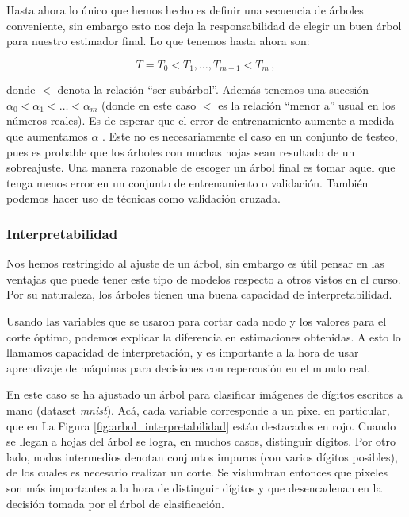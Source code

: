 Hasta ahora lo único que hemos hecho es definir una secuencia de árboles conveniente, sin embargo esto nos deja la responsabilidad de elegir un buen árbol para nuestro estimador final. Lo que tenemos hasta ahora son:

\begin{equation}
    T = T_0 < T_1, \dots, T_{m-1} < T_m \,,
\end{equation}

donde $<$ denota la relación ``ser subárbol''. Además tenemos una sucesión $\alpha_0 < \alpha_1 < \dots < \alpha_m$ (donde en este caso $<$ es la relación ``menor a'' usual en los números reales). Es de esperar que el error de entrenamiento aumente a medida que aumentamos $\alpha$ . Este no es necesariamente el caso en un conjunto de testeo, pues es probable que los árboles con muchas hojas sean resultado de un sobreajuste. Una manera razonable de escoger un árbol final es tomar aquel que tenga menos error en un conjunto de entrenamiento o validación. También podemos hacer uso de técnicas como validación cruzada.


\subsubsection{Interpretabilidad}

Nos hemos restringido al ajuste de un árbol, sin embargo es útil pensar en las ventajas que puede tener este tipo de modelos respecto a otros vistos en el curso. Por su naturaleza, los árboles tienen una buena capacidad de interpretabilidad. %

Usando las variables que se usaron para cortar cada nodo y los valores para el corte óptimo, podemos explicar la diferencia en estimaciones obtenidas. A esto lo llamamos capacidad de interpretación, y es importante a la hora de usar aprendizaje de máquinas para decisiones con repercusión en el mundo real.

En este caso se ha ajustado un árbol para clasificar imágenes de dígitos escritos a mano (dataset \textit{mnist}). Acá, cada variable corresponde a un pixel en particular, que en La Figura \ref{fig:arbol_interpretabilidad} están destacados en rojo. Cuando se llegan a hojas del árbol se logra, en muchos casos, distinguir dígitos. Por otro lado, nodos intermedios denotan conjuntos impuros (con varios dígitos posibles), de los cuales es necesario realizar un corte. Se vislumbran entonces que pixeles son más importantes a la hora de distinguir dígitos y que desencadenan en la decisión tomada por el árbol de clasificación.

